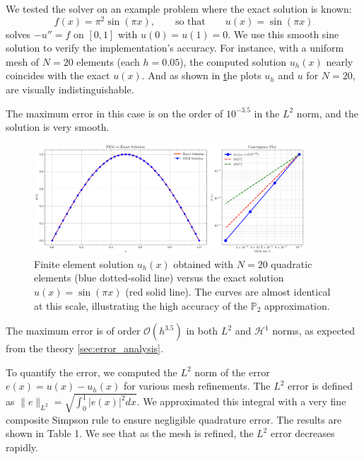 \documentclass[a4paper,10pt]{article}
\begin{document}
We tested the solver on an example problem where the exact solution is known:
\[
	f(x) = \pi^2 \sin(\pi x), \qquad \text{so that}\qquad u(x) = \sin(\pi x)
\]
solves \(-u''=f\) on \([0,1]\) with \(u(0)=u(1)=0\).
We use this smooth sine solution to verify the implementation's accuracy.
For instance, with a uniform mesh of \(N=20\) elements (each \(h=0.05\)), the computed solution \(u_h(x)\) nearly coincides with the exact \(u(x)\).
And as shown in \href{fig:solution_20_2} the plots \(u_h\) and \(u\) for \(N=20\), are visually indistinguishable.

The maximum error in this case is on the order of \(10^{-3.5}\) in the \(L^2\) norm, and the solution is very smooth.

\begin{figure}[H]
	\centering
	\includegraphics[width=0.9\textwidth]{figures/fem_solution_20_2.png}
	\caption{Finite element solution \(u_h(x)\) obtained with \(N=20\) quadratic elements (blue dotted-solid line) versus the exact solution \(u(x)=\sin(\pi x)\) (red solid line).
		The curves are almost identical at this scale, illustrating the high accuracy of the \(\mathbb{P}_2 \) approximation.}
	\label{fig:solution_20_2}
\end{figure}
The maximum error is of order \(\mathcal{O}(h^{3.5})\) in both \(L^2\) and \(\mathcal{H}^1\) norms, as expected from the theory \ref{sec:error_analysis}.

To quantify the error, we computed the \(L^2\) norm of the error \(e(x)=u(x)-u_h(x)\) for various mesh refinements.
The \(L^2\) error is defined as \(\|e\|_{L^2} = \sqrt{\int_0^1 |e(x)|^2 dx}\).
We approximated this integral with a very fine composite Simpson rule to ensure negligible quadrature error.
The results are shown in Table 1.
We see that as the mesh is refined, the \(L^2\) error decreases rapidly.
\end{document}
